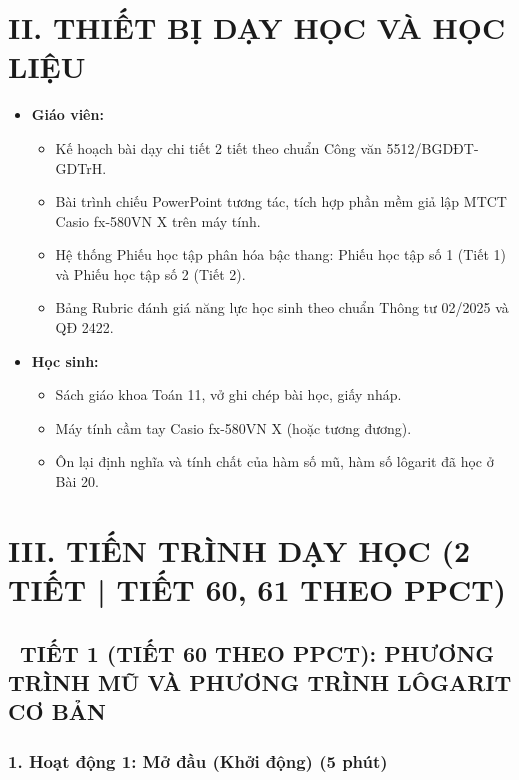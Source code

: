 \documentclass[12pt, a4paper]{article}
\begin{document}
\vspace{5pt}

\section*{II. THIẾT BỊ DẠY HỌC VÀ HỌC LIỆU}

\begin{itemize}[leftmargin=1.2cm]
    \item \textbf{Giáo viên:}
    \begin{itemize}[leftmargin=0.6cm]
        \item Kế hoạch bài dạy chi tiết 2 tiết theo chuẩn Công văn 5512/BGDĐT-GDTrH.
        \item Bài trình chiếu PowerPoint tương tác, tích hợp phần mềm giả lập MTCT Casio fx-580VN X trên máy tính.
        \item Hệ thống Phiếu học tập phân hóa bậc thang: Phiếu học tập số 1 (Tiết 1) và Phiếu học tập số 2 (Tiết 2).
        \item Bảng Rubric đánh giá năng lực học sinh theo chuẩn Thông tư 02/2025 và QĐ 2422.
    \end{itemize}
    \item \textbf{Học sinh:}
    \begin{itemize}[leftmargin=0.6cm]
        \item Sách giáo khoa Toán 11, vở ghi chép bài học, giấy nháp.
        \item Máy tính cầm tay Casio fx-580VN X (hoặc tương đương).
        \item Ôn lại định nghĩa và tính chất của hàm số mũ, hàm số lôgarit đã học ở Bài 20.
    \end{itemize}
\end{itemize}

\vspace{5pt}

\section*{III. TIẾN TRÌNH DẠY HỌC (2 TIẾT | TIẾT 60, 61 THEO PPCT)}

\subsection*{\faClockO \ TIẾT 1 (TIẾT 60 THEO PPCT): PHƯƠNG TRÌNH MŨ VÀ PHƯƠNG TRÌNH LÔGARIT CƠ BẢN}

\subsubsection*{1. Hoạt động 1: Mở đầu (Khởi động) (5 phút)}
\end{document}
